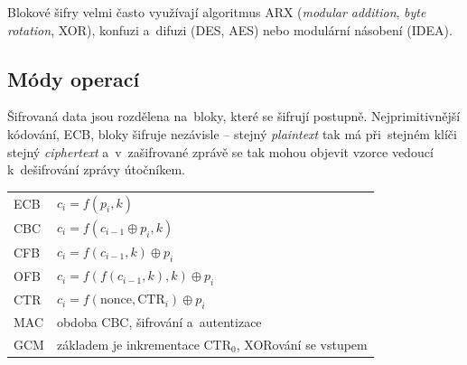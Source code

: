 Blokové šifry velmi často využívají algoritmus ARX (\emph{modular addition}, \emph{byte rotation}, XOR), konfuzi a~difuzi (DES, AES) nebo modulární násobení (IDEA).

\subsection{Módy operací}

Šifrovaná data jsou rozdělena na~bloky, které se šifrují postupně. Nejprimitivnější kódování, ECB, bloky šifruje nezávisle -- stejný \emph{plaintext} tak má při~stejném klíči stejný \emph{ciphertext} a~v~zašifrované zprávě se tak mohou objevit vzorce vedoucí k~dešifrování zprávy útočníkem.

\begin{table}[ht]
\centering
\begin{tabular}{p{1cm}|p{14cm}}
ECB & $c_i = f(p_i, k)$ \\
CBC & $c_i = f(c_{i-1} \oplus p_i, k)$ \\
CFB & $c_i = f(c_{i-1}, k) \oplus p_i$ \\
OFB & $c_i = f(f(c_{i-1}, k), k) \oplus p_i$ \\
CTR & $c_i = f(\mathrm{nonce}, \mathrm{CTR}_i) \oplus p_i$ \\
MAC & obdoba CBC, šifrování a~autentizace \\
GCM & základem je inkrementace CTR$_0$, XORování se vstupem \\
\end{tabular}
\end{table}

